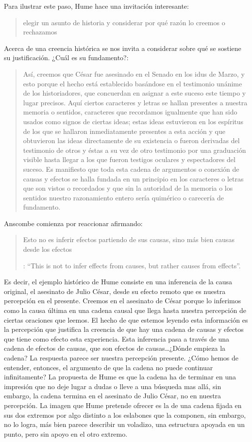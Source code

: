 Para ilustrar este paso, Hume hace una invitación interesante: \blockquote[{\Cite[58]{hume1740treatisees}}]{elegir un asunto de historia y considerar por qué razón lo creemos o rechazamos}. Acerca de una creencia histórica se nos invita a considerar sobre qué se sostiene su justificación. ¿Cuál es su fundamento?: \blockquote[{\Cite[58-59]{hume1740treatisees}}]{Así, creemos que César fue asesinado en el Senado en los idus de Marzo, y esto porque el hecho está establecido basándose en el testimonio unánime de los historiadores, que concuerdan en asignar a este suceso este tiempo y lugar precisos. Aquí ciertos caracteres y letras se hallan presentes a nuestra memoria o sentidos, caracteres que recordamos igualmente que han sido usados como signos de ciertas ideas; estas ideas estuvieron en los espíritus de los que se hallaron inmediatamente presentes a esta acción y que obtuvieron las ideas directamente de su existencia o fueron derivadas del testimonio de otros y éstas a su vez de otro testimonio por una graduación visible hasta llegar a los que fueron testigos oculares y espectadores del suceso. Es manifiesto que toda esta cadena de argumentos o conexión de causas y efectos se halla fundada en un principio en los caracteres o letras que son vistos o recordados y que sin la autoridad de la memoria o los sentidos nuestro razonamiento entero sería quimérico o carecería de fundamento.}.

Anscombe comienza por reaccionar afirmando: \blockquote[{\Cite[86]{anscombe1981parmenides:humeandjulius}}: \enquote{This is not to infer effects from causes, but rather causes from effects}.]{Esto no es inferir efectos partiendo de sus causas, sino más bien causas desde los efectos}. Es decir, el ejemplo histórico de Hume consiste en una inferencia de la causa original, el asesinato de Julio César, desde su efecto remoto que es nuestra percepción en el presente. Creemos en el asesinato de César porque lo inferimos como la causa última en una cadena causal que llega hasta nuestra percepción de ciertas oraciones que leemos. El hecho de que estemos leyendo esta información es la percepción que justifica la creencia de que hay una cadena de causas y efectos que tiene como efecto esta experiencia. Esta inferencia pasa a través de una cadena de efectos de causas, que son efectos de causas\ldots ¿Dónde empieza la cadena? La respuesta parece ser nuestra percepción presente. ¿Cómo hemos de entender, entonces, el argumento de que la cadena no puede continuar infinitamente? La propuesta de Hume es que la cadena ha de terminar en una impresión que no deje lugar a dudas o lleve a una búsqueda mas allá, sin embargo, la cadena termina en el asesinato de Julio César, no en nuestra percepción. La imagen que Hume pretende ofrecer es la de una cadena fijada en sus dos extremos por algo distinto a los eslabones que la componen, sin embargo, no lo logra, más bien parece describir un voladizo, una estructura apoyada en un punto, pero sin apoyo en el otro extremo.

